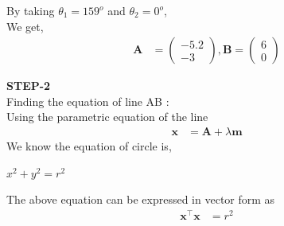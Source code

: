 \documentclass[10pt,a4paper]{report}
\newcommand{\myvec}[1]{\ensuremath{\begin{pmatrix}#1\end{pmatrix}}}
\let\vec\mathbf
\begin{document}
\begin{multicols}{2}
\vspace{5.2mm} 
By taking $\theta_1 = 159^o$ and $\theta_2=0^o$, \vspace{2mm}\\
We get, 
\begin{align}
\vec{A} &= \myvec{-5.2 \\ -3}, \vec{B} = \myvec{6 \\ 0} 
\end{align}



\textbf{STEP-2}\vspace{2mm}\\
Finding the equation of line AB : \\\vspace{2mm}
Using the parametric equation of the line
		    \begin{align}
			    \label{eq:line-param}
			    \vec{x} &= \vec{A} + \lambda \vec{m}
		    \end{align}
We know the equation of circle is,\\
\begin{center}
    $ x^2 + y^2 = r^2 $ \vspace{2mm}
\end{center}
The above equation can be expressed in vector form as
		    \begin{align}
			    \label{eq:circ-param}
			    \vec{x}^{\top}\vec{x} &= r^2
		    \end{align}
		    

\end{multicols}
\end{document}

